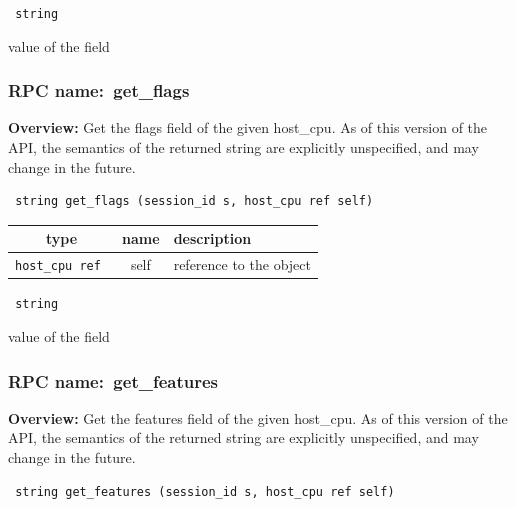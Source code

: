 \vspace{0.3cm}

{\tt 
string
}


value of the field
\vspace{0.3cm}
\vspace{0.3cm}
\vspace{0.3cm}
\subsubsection{RPC name:~get\_flags}

{\bf Overview:} 
Get the flags field of the given host\_cpu.  As of this version of the
API, the semantics of the returned string are explicitly unspecified,
and may change in the future.

\begin{verbatim} string get_flags (session_id s, host_cpu ref self)\end{verbatim}



 
\vspace{0.3cm}
\begin{tabular}{|c|c|p{7cm}|}
 \hline
{\bf type} & {\bf name} & {\bf description} \\ \hline
{\tt host\_cpu ref } & self & reference to the object \\ \hline 

\end{tabular}

\vspace{0.3cm}

{\tt 
string
}


value of the field
\vspace{0.3cm}
\vspace{0.3cm}
\vspace{0.3cm}
\subsubsection{RPC name:~get\_features}

{\bf Overview:} 
Get the features field of the given host\_cpu. As of this version of the
API, the semantics of the returned string are explicitly unspecified,
and may change in the future.

\begin{verbatim} string get_features (session_id s, host_cpu ref self)\end{verbatim}


